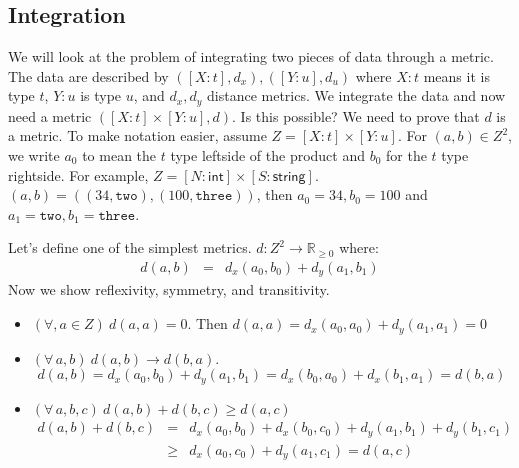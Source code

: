 \documentclass{article}
\begin{document}
\subsection*{Integration}
We will look at the problem of integrating two pieces of data through a metric.  The data are described by $([X:t], d_x), ([Y:u], d_u)$ where $X:t$ means it is type $t$,  $Y:u$ is type $u$, and $d_x,d_y$ distance metrics.  We integrate the data and now need a metric $([X:t]\times [Y:u], d)$.  Is this possible?  We need to prove  that $d$ is a metric.  To make notation easier, assume $Z = [X:t]\times [Y:u]$.  For $(a,b) \in Z^2$, we write $a_0$ to mean the $t$ type leftside of the product and $b_0$ for the $t$ type rightside.  For example, $Z = [N : \textsf{int}] \times [S : \textsf{string}]$.  $(a,b) = ((34, \texttt{two}), (100, \texttt{three}))$, then $a_0 = 34, b_0 = 100$ and $a_1 = \texttt{two}, b_1 = \texttt{three}$.

Let's define one of the simplest metrics.
$d:Z^2 \rightarrow \mathbb{R}_{\geq 0}$ where:
\begin{eqnarray*}
d(a,b) &=& d_x(a_0,b_0) + d_y(a_1,b_1)
\end{eqnarray*}
Now we show reflexivity, symmetry, and transitivity.  
\begin{itemize}
\item $(\forall, a \in Z)\ d(a,a) = 0$.  Then $d(a,a) = d_x(a_0,a_0) + d_y(a_1,a_1) = 0$  
\item $(\forall\, a, b)\ d(a,b) \rightarrow d(b,a)$.    
\[ d(a,b) = d_x(a_0,b_0) + d_y(a_1,b_1) = d_x(b_0,a_0) + d_x(b_1,a_1) = d(b,a) \]
\item $(\forall\, a,b,c)\ d(a,b) + d(b,c) \geq d(a,c)$
\begin{eqnarray*}
d(a,b) + d(b,c) &=& d_x(a_0,b_0) + d_x(b_0,c_0) + d_y(a_1,b_1) + d_y(b_1,c_1)\\
&\geq& d_x(a_0,c_0) + d_y(a_1,c_1) = d(a,c)\\
\end{eqnarray*}
\end{itemize} 
\end{document}
